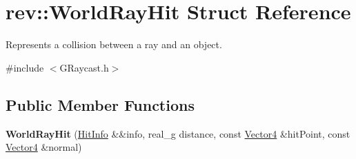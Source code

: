 \hypertarget{structrev_1_1_world_ray_hit}{}\section{rev\+::World\+Ray\+Hit Struct Reference}
\label{structrev_1_1_world_ray_hit}


Represents a collision between a ray and an object.  




{\ttfamily \#include $<$G\+Raycast.\+h$>$}

\subsection*{Public Member Functions}
\begin{DoxyCompactItemize}
\item 
\mbox{\label{structrev_1_1_world_ray_hit_a90dfbde7dce8818dfd4278350cf0756a}} 
{\bfseries World\+Ray\+Hit} (\mbox{\hyperlink{structrev_1_1_hit_info}{Hit\+Info}} \&\&info, real\+\_\+g distance, const \mbox{\hyperlink{classrev_1_1_vector}{Vector4}} \&hit\+Point, const \mbox{\hyperlink{classrev_1_1_vector}{Vector4}} \&normal)
\end{DoxyCompactItemize}
